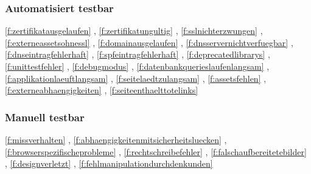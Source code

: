 \subsubsection{Automatisiert testbar}
\label{ssub:automatisiert_testbar}

\ref{f:zertifikatausgelaufen} \fzertifikatausgelaufen, \ref{f:zertifikatungultig} \fzertifikatungultig, \ref{f:sslnichterzwungen} \fsslnichterzwungen, \ref{f:externeassetsohnessl} \fexterneassetsohnessl, \ref{f:domainausgelaufen} \fdomainausgelaufen, \ref{f:dnsservernichtverfuegbar} \fdnsservernichtverfuegbar, \ref{f:dnseintragfehlerhaft} \fdnseintragfehlerhaft, \ref{f:spfeintragfehlerhaft} \fspfeintragfehlerhaft, \ref{f:deprecatedlibrarys} \fdeprecatedlibrarys, \ref{f:unittestfehler} \funittestfehler, \ref{f:debugmodus} \fdebugmodus, \ref{f:datenbankquerieslaufenlangsam} \fdatenbankquerieslaufenlangsam, \ref{f:applikationlaeuftlangsam} \fapplikationlaeuftlangsam, \ref{f:seitelaedtzulangsam} \fseitelaedtzulangsam, \ref{f:assetsfehlen} \fassetsfehlen, \ref{f:externeabhaengigkeiten} \fassetsfehlen, \ref{f:seiteenthaelttotelinks} \fseiteenthaelttotelinks

\subsubsection{Manuell testbar}
\label{ssub:manuel_testbar}

\ref{f:missverhalten} \fmissverhalten, \ref{f:abhaengigkeitenmitsicherheitsluecken} \fabhaengigkeitenmitsicherheitsluecken, \ref{f:browserspezifischeprobleme} \fbrowserspezifischeprobleme, \ref{f:rechtschreibefehler} \frechtschreibefehler, \ref{f:falschaufbereitetebilder} \ffalschaufbereitetebilder, \ref{f:designverletzt} \fdesignverletzt, \ref{f:fehlmanipulationdurchdenkunden} \ffehlmanipulationdurchdenkunden
